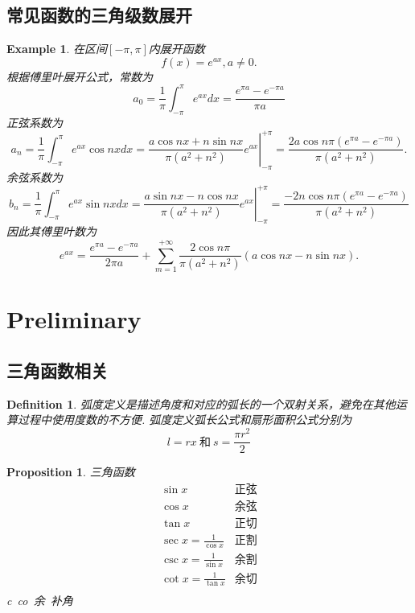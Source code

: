 \documentclass{article}
\newtheorem{proposition}[theorem]{Proposition}
\newtheorem{example}[theorem]{Example}
\newtheorem{definition}[theorem]{Definition}
\begin{document}
\subsection{常见函数的三角级数展开}

\begin{example}
\rm 在区间$[-\pi,\pi]$内展开函数
$$
f(x) = e^{ax}, a\neq 0.
$$
根据傅里叶展开公式，常数为
$$
a_0  = \frac{1}{\pi} \int_{-\pi}^{\pi} e^{ax}dx = \frac{e^{\pi a}-e^{-\pi a}}{\pi a}
$$
正弦系数为
$$
a_n  = \frac{1}{\pi} \int_{-\pi}^{\pi} e^{ax}\cos nxdx = \left. \frac{a\cos nx  + n\sin nx}{\pi(a^2+n^2)}e^{ax} \right|_{-\pi}^{+\pi} = \frac{2a\cos n\pi (e^{\pi a}-e^{-\pi a})}{\pi(a^2+n^2)}. 
$$
余弦系数为
$$
b_n = \frac{1}{\pi} \int_{-\pi}^{\pi} e^{ax}\sin nxdx  = \left. \frac{a\sin nx  - n\cos nx}{\pi(a^2+n^2)}e^{ax} \right|_{-\pi}^{+\pi} = \frac{-2n\cos n\pi (e^{\pi a}-e^{-\pi a})}{\pi(a^2+n^2)}
$$
因此其傅里叶数为
$$
e^{ax} = \frac{e^{\pi a}-e^{-\pi a}}{2\pi a} + \sum\limits_{m=1}^{+\infty} \frac{2\cos n\pi}{\pi(a^2+n^2)}(a\cos nx - n\sin nx). 
$$
\end{example}

\newpage
\section{Preliminary}

\subsection{三角函数相关}
\begin{definition}
\rm 弧度定义是{\color{red}描述角度和对应的弧长的一个双射关系}，避免在其他运算过程中使用度数的不方便. 弧度定义{\color{red}弧长公式}和{\color{red}扇形面积公式}分别为
$$
l = rx ~\text{和}~ s = \frac{\pi r^2}{2}
$$
\end{definition}

\begin{proposition}
\rm 三角函数
$$
\begin{array}{ll}
\sin x & \text{正弦} \\
\cos x & \text{余弦} \\
\tan x & \text{正切} \\
\sec x = \frac{1}{\cos x} & \text{正割} \\
\csc x = \frac{1}{\sin x} & \text{余割} \\
\cot x = \frac{1}{\tan x} & \text{余切} \\
\end{array}
$$
c~co~余~补角
\end{proposition}
\end{document}
